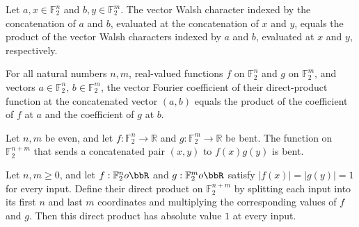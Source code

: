 \begin{theorem}
\label{FABL.vectorWalshCharacter_append}
\leanok
{}
Let $a,x\in\mathbb{F}_2^n$ and $b,y\in\mathbb{F}_2^m$. The vector Walsh character
indexed by the concatenation of $a$ and $b$, evaluated at the concatenation of $x$ and
$y$, equals the product of the vector Walsh characters indexed by $a$ and $b$, evaluated
at $x$ and $y$, respectively.
\end{theorem}

\begin{theorem}
\label{FABL.vectorFourierCoeff_bentDirectProduct_append}
\leanok
{}
For all natural numbers $n,m$, real-valued functions $f$ on $\mathbb{F}_2^n$ and $g$ on
$\mathbb{F}_2^m$, and vectors $a\in\mathbb{F}_2^n$, $b\in\mathbb{F}_2^m$, the vector
Fourier coefficient of their direct-product function at the concatenated vector $(a,b)$
equals the product of the coefficient of $f$ at $a$ and the coefficient of $g$ at $b$.
\end{theorem}

\begin{theorem}
\label{FABL.IsBent.directProduct}
\leanok
{}
Let $n,m$ be even, and let $f:\mathbb F_2^n\to\mathbb R$ and $g:\mathbb F_2^m\to\mathbb
R$ be bent. The function on $\mathbb F_2^{n+m}$ that sends a concatenated pair $(x,y)$
to $f(x)g(y)$ is bent.
\end{theorem}

\begin{theorem}
\label{FABL.IsSignValued.directProduct}
\leanok
{}
Let $n,m\ge 0$, and let $f:\mathbb{F}_2^n	o\bbR$ and $g:\mathbb{F}_2^m	o\bbR$ satisfy $|f(x)|=|g(y)|=1$ for
every input. Define their direct product on $\mathbb{F}_2^{n+m}$ by splitting each input into its
first $n$ and last $m$ coordinates and multiplying the corresponding values of $f$ and
$g$. Then this direct product has absolute value $1$ at every input.
\end{theorem}

